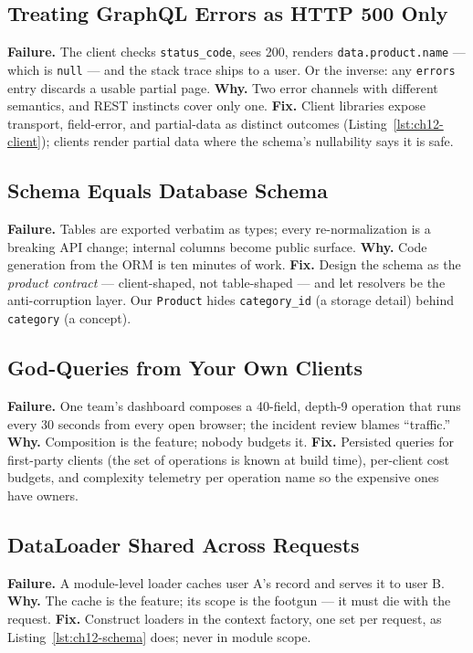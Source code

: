 \subsection{Treating GraphQL Errors as HTTP 500 Only}
\textbf{Failure.} The client checks \texttt{status\_code}, sees 200,
renders \texttt{data.product.name} --- which is \texttt{null} --- and the
stack trace ships to a user. Or the inverse: any \texttt{errors} entry
discards a usable partial page. \textbf{Why.} Two error channels with
different semantics, and REST instincts cover only one. \textbf{Fix.}
Client libraries expose transport, field-error, and partial-data as
distinct outcomes (Listing~\ref{lst:ch12-client}); clients render partial
data where the schema's nullability says it is safe.

\subsection{Schema Equals Database Schema}
\textbf{Failure.} Tables are exported verbatim as types; every
re-normalization is a breaking API change; internal columns become public
surface. \textbf{Why.} Code generation from the ORM is ten minutes of
work. \textbf{Fix.} Design the schema as the \emph{product contract}
--- client-shaped, not table-shaped --- and let resolvers be the
anti-corruption layer. Our \texttt{Product} hides
\texttt{category\_id} (a storage detail) behind \texttt{category} (a
concept).

\subsection{God-Queries from Your Own Clients}
\textbf{Failure.} One team's dashboard composes a 40-field, depth-9
operation that runs every 30 seconds from every open browser; the
incident review blames ``traffic.'' \textbf{Why.} Composition is the
feature; nobody budgets it. \textbf{Fix.} Persisted queries for first-party
clients (the set of operations is known at build time), per-client cost
budgets, and complexity telemetry per operation name so the expensive
ones have owners.

\subsection{DataLoader Shared Across Requests}
\textbf{Failure.} A module-level loader caches user A's record and serves
it to user B. \textbf{Why.} The cache is the feature; its scope is the
footgun --- it must die with the request. \textbf{Fix.} Construct loaders
in the context factory, one set per request, as
Listing~\ref{lst:ch12-schema} does; never in module scope.

